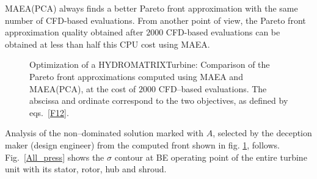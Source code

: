 MAEA(PCA) always finds a better Pareto front approximation with the same number of CFD-based evaluations. From another point of view, the Pareto front approximation quality obtained after $2000$ CFD-based evaluations can be  obtained at less than half this CPU cost using MAEA. 

\begin{figure}[h!]
\begin{minipage}[b]{1\linewidth}
 \centering
\end{minipage}
\caption{Optimization of a HYDROMATRIX\circledR Turbine: Comparison of the Pareto front approximations computed using MAEA and MAEA(PCA), at the cost of $2000$ CFD--based evaluations.  The abscissa and ordinate correspond to the two objectives, as defined by eqs.~\ref{F12}.}
\label{pareto_matrix}
\end{figure}
 
 
Analysis of the non--dominated solution marked with $A$, selected by the deception maker (design engineer) from the computed front shown in fig. \ref{pareto_matrix}, follows. Fig.~\ref{All_press} shows the $\sigma$ contour at BE operating point of the entire turbine unit with its stator, rotor, hub and shroud. 

